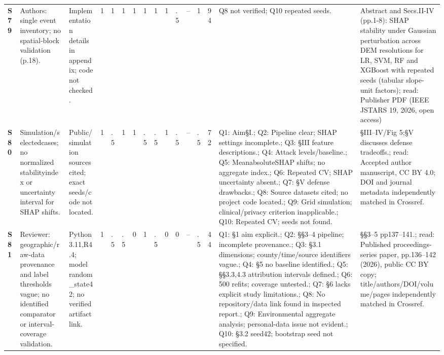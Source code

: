 \begin{longtable}{@{}P{1.0cm}P{4.6cm}P{3.6cm}P{0.3cm}P{0.3cm}P{0.3cm}P{0.3cm}P{0.3cm}P{0.3cm}P{0.3cm}P{0.3cm}P{0.3cm}P{0.36cm}P{0.75cm}P{3.0cm}P{3.9cm}@{}}
\textbf{S79} & Authors: single event inventory; no spatial-block validation (p.18). & Implementation details in appendix; code not checked. & 1 & 1 & 1 & 1 & 1 & 1 & 1 & .5 & -- & 1 & 94 & Q8 not verified; Q10 repeated seeds. & Abstract and Secs.II-IV (pp.1-8): SHAP stability under Gaussian perturbation across DEM resolutions for LR, SVM, RF and XGBoost with repeated seeds (tabular slope-unit factors); read: Publisher PDF (IEEE JSTARS 19, 2026, open access) \\
\textbf{S80} & Simulation/\allowbreak{}selectedcases; no normalized stabilityindex or uncertainty interval for SHAP shifts. & Public/\allowbreak{}simulation sources cited; exact seeds/\allowbreak{}code not located. & 1 & .5 & 1 & 1 & .5 & .5 & 1 & .5 & -- & .5 & 72 & Q1: Aim§I.; Q2: Pipeline clear; SHAP settings incomplete.; Q3: §III feature descriptions.; Q4: Attack levels/\allowbreak{}baseline.; Q5: MeanabsoluteSHAP shifts; no aggregate index.; Q6: Repeated CV; SHAP uncertainty absent.; Q7: §V defense drawbacks.; Q8: Source datasets cited; no project code located.; Q9: Grid simulation; clinical/\allowbreak{}privacy criterion inapplicable.; Q10: Repeated CV; seeds not found. & §III--IV/\allowbreak{}Fig 5;§V discusses defense tradeoffs.; read: Accepted author manuscript, CC BY 4.0; DOI and journal metadata independently matched in Crossref. \\
\textbf{S81} & Reviewer: geographic/\allowbreak{}raw-data provenance and label thresholds vague; no identified comparator or interval-coverage validation. & Python3.11,R4.4; model random\_\allowbreak{}state42; no verified artifact link. & 1 & .5 & .5 & 0 & 1 & .5 & 0 & 0 & -- & .5 & 44 & Q1: §1 aim explicit.; Q2: §§3--4 pipeline; incomplete provenance.; Q3: §3.1 dimensions; county/\allowbreak{}time/\allowbreak{}source identifiers vague.; Q4: §5 no baseline identified.; Q5: §§3.3,4.3 attribution intervals defined.; Q6: 500 refits; coverage untested.; Q7: §6 lacks explicit study limitations.; Q8: No repository/\allowbreak{}data link found in inspected report.; Q9: Environmental aggregate analysis; personal-data issue not evident.; Q10: §3.2 seed42; bootstrap seed not specified. & §§3--5 pp137--141.; read: Published proceedings-series paper, pp.136--142 (2026), public CC BY copy; title/\allowbreak{}authors/\allowbreak{}DOI/\allowbreak{}volume/\allowbreak{}pages independently matched in Crossref. \\

\end{longtable}
